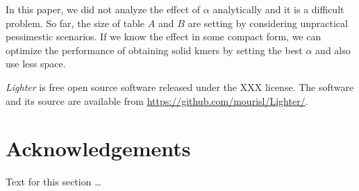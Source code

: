 \documentclass[10pt]{article}
\begin{document}



In this paper, we did not analyze the effect of $\alpha$ analytically and it is a difficult problem. So far, the size of table $A$ and $B$ are setting by considering unpractical pessimestic scenarios. If we know the effect in some compact form, we can optimize the performance of obtaining solid kmers by setting the best $\alpha$ and also use less space.

\emph{Lighter} is free open source software released under the XXX license.  The software and its source are available from \url{https://github.com/mourisl/Lighter/}.

\section*{Acknowledgements}
  Text for this section \ldots



\end{document}
